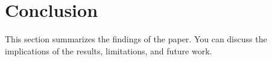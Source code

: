 \section{Conclusion}
This section summarizes the findings of the paper. You can discuss the implications of the results, limitations, and future work.
